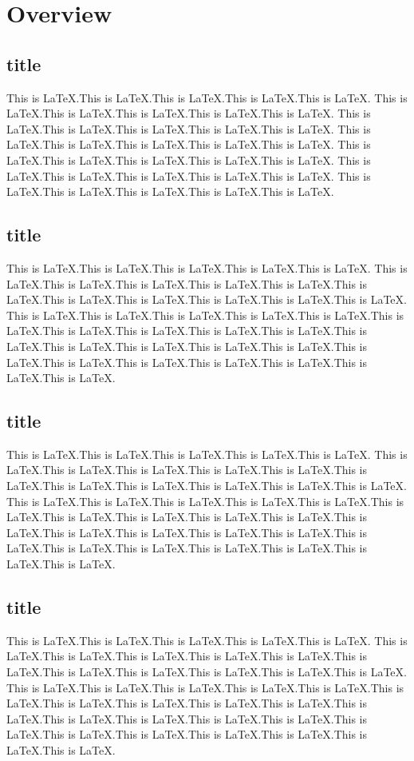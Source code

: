 \documentclass{book}
\begin{document}
\tableofcontents

\chapter{Overview}
\setcounter{page}{1} %
\section{title}
This is LaTeX.This is LaTeX.This is LaTeX.This is LaTeX.This is LaTeX.
This is LaTeX.This is LaTeX.This is LaTeX.This is LaTeX.This is LaTeX.
This is LaTeX.This is LaTeX.This is LaTeX.This is LaTeX.This is LaTeX.
This is LaTeX.This is LaTeX.This is LaTeX.This is LaTeX.This is LaTeX.
This is LaTeX.This is LaTeX.This is LaTeX.This is LaTeX.This is LaTeX.
This is LaTeX.This is LaTeX.This is LaTeX.This is LaTeX.This is LaTeX.
This is LaTeX.This is LaTeX.This is LaTeX.This is LaTeX.This is LaTeX.

\section{title}
This is LaTeX.This is LaTeX.This is LaTeX.This is LaTeX.This is LaTeX.
This is LaTeX.This is LaTeX.This is LaTeX.This is LaTeX.This is LaTeX.This is LaTeX.This is LaTeX.This is LaTeX.This is LaTeX.This is LaTeX.This is LaTeX.
This is LaTeX.This is LaTeX.This is LaTeX.This is LaTeX.This is LaTeX.This is LaTeX.This is LaTeX.This is LaTeX.This is LaTeX.This is LaTeX.This is LaTeX.This is LaTeX.This is LaTeX.This is LaTeX.This is LaTeX.This is LaTeX.This is LaTeX.This is LaTeX.This is LaTeX.This is LaTeX.This is LaTeX.This is LaTeX.

\section{title}
This is LaTeX.This is LaTeX.This is LaTeX.This is LaTeX.This is LaTeX.
This is LaTeX.This is LaTeX.This is LaTeX.This is LaTeX.This is LaTeX.This is LaTeX.This is LaTeX.This is LaTeX.This is LaTeX.This is LaTeX.This is LaTeX.
This is LaTeX.This is LaTeX.This is LaTeX.This is LaTeX.This is LaTeX.This is LaTeX.This is LaTeX.This is LaTeX.This is LaTeX.This is LaTeX.This is LaTeX.This is LaTeX.This is LaTeX.This is LaTeX.This is LaTeX.This is LaTeX.This is LaTeX.This is LaTeX.This is LaTeX.This is LaTeX.This is LaTeX.This is LaTeX.

\section{title}
This is LaTeX.This is LaTeX.This is LaTeX.This is LaTeX.This is LaTeX.
This is LaTeX.This is LaTeX.This is LaTeX.This is LaTeX.This is LaTeX.This is LaTeX.This is LaTeX.This is LaTeX.This is LaTeX.This is LaTeX.This is LaTeX.
This is LaTeX.This is LaTeX.This is LaTeX.This is LaTeX.This is LaTeX.This is LaTeX.This is LaTeX.This is LaTeX.This is LaTeX.This is LaTeX.This is LaTeX.This is LaTeX.This is LaTeX.This is LaTeX.This is LaTeX.This is LaTeX.This is LaTeX.This is LaTeX.This is LaTeX.This is LaTeX.This is LaTeX.This is LaTeX.
\end{document}
